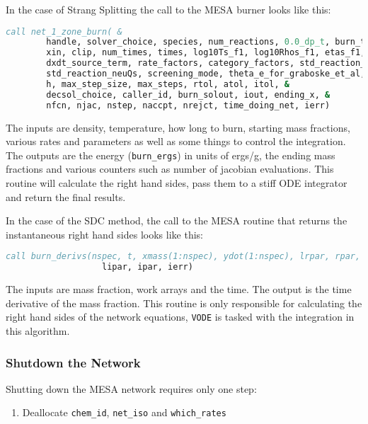 In the case of Strang Splitting the call to the {\sf MESA} burner looks like 
this:
\begin{lstlisting}[language=fortran,mathescape=false]
  call net_1_zone_burn( &
        handle, solver_choice, species, num_reactions, 0.0_dp_t, burn_tend, &
        xin, clip, num_times, times, log10Ts_f1, log10Rhos_f1, etas_f1, &
        dxdt_source_term, rate_factors, category_factors, std_reaction_Qs, &
        std_reaction_neuQs, screening_mode, theta_e_for_graboske_et_al, &
        h, max_step_size, max_steps, rtol, atol, itol, &
        decsol_choice, caller_id, burn_solout, iout, ending_x, &
        nfcn, njac, nstep, naccpt, nrejct, time_doing_net, ierr)
\end{lstlisting}
The inputs are density, temperature, how long to burn, starting mass 
fractions, various rates and parameters as well as some things to control the 
integration. The outputs are the energy ({\tt burn\_ergs}) in units of ergs/g, 
the ending mass fractions and various counters such as number of jacobian 
evaluations. This routine will calculate the right hand sides, pass them 
to a stiff ODE integrator and return the final results.

In the case of the SDC method, the call to the {\sf MESA} routine that returns 
the instantaneous right hand sides looks like this:
\begin{lstlisting}[language=fortran,mathescape=false]
  call burn_derivs(nspec, t, xmass(1:nspec), ydot(1:nspec), lrpar, rpar, &
                   lipar, ipar, ierr)
\end{lstlisting}
The inputs are mass fraction, work arrays and the time. The output is the 
time derivative of the mass fraction. This routine is only responsible for 
calculating the right hand sides of the network equations, {\tt VODE} is tasked 
with the integration in this algorithm.

\subsubsection{Shutdown the Network}

Shutting down the {\sf MESA} network requires only one step:
\begin{enumerate}
\item Deallocate {\tt chem\_id}, {\tt net\_iso} and {\tt which\_rates}
\end{enumerate}


